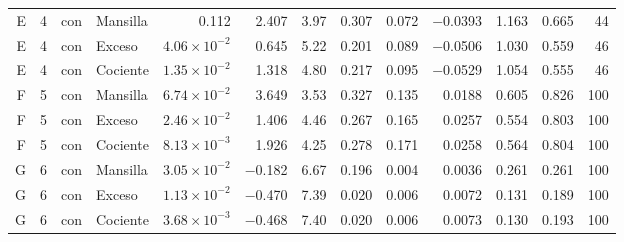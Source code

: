 \documentclass[11pt,letterpaper]{article}
\begin{document}
\begin{table}[H]
\begin{adjustbox}{max width=\textwidth}
\begin{tabular}{rrllrrrrrrrrr}
E & 4 & con & Mansilla & 0.112 & 2.407 & 3.97 & 0.307 & 0.072 & $-$0.0393 & 1.163 & 0.665 & 44 \\
E & 4 & con & Exceso & $4.06\times10^{-2}$ & 0.645 & 5.22 & 0.201 & 0.089 & $-$0.0506 & 1.030 & 0.559 & 46 \\
E & 4 & con & Cociente & $1.35\times10^{-2}$ & 1.318 & 4.80 & 0.217 & 0.095 & $-$0.0529 & 1.054 & 0.555 & 46 \\
F & 5 & con & Mansilla & $6.74\times10^{-2}$ & 3.649 & 3.53 & 0.327 & 0.135 & 0.0188 & 0.605 & 0.826 & 100 \\
F & 5 & con & Exceso & $2.46\times10^{-2}$ & 1.406 & 4.46 & 0.267 & 0.165 & 0.0257 & 0.554 & 0.803 & 100 \\
F & 5 & con & Cociente & $8.13\times10^{-3}$ & 1.926 & 4.25 & 0.278 & 0.171 & 0.0258 & 0.564 & 0.804 & 100 \\
G & 6 & con & Mansilla & $3.05\times10^{-2}$ & $-$0.182 & 6.67 & 0.196 & 0.004 & 0.0036 & 0.261 & 0.261 & 100 \\
G & 6 & con & Exceso & $1.13\times10^{-2}$ & $-$0.470 & 7.39 & 0.020 & 0.006 & 0.0072 & 0.131 & 0.189 & 100 \\
G & 6 & con & Cociente & $3.68\times10^{-3}$ & $-$0.468 & 7.40 & 0.020 & 0.006 & 0.0073 & 0.130 & 0.193 & 100 \\
\bottomrule
\end{tabular}
\end{adjustbox}
\end{table}
\end{document}
